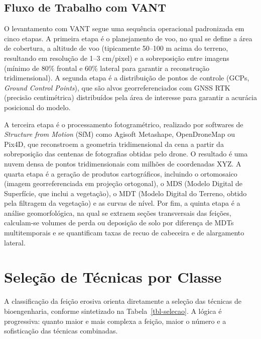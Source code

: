\documentclass[
  portuguese,
  11pt,
  a4paper,
  open=any]{scrbook}
\begin{document}
\subsection{Fluxo de Trabalho com
VANT}\label{fluxo-de-trabalho-com-vant}

O levantamento com VANT segue uma sequência operacional padronizada em
cinco etapas. A primeira etapa é o planejamento de voo, no qual se
define a área de cobertura, a altitude de voo (tipicamente 50--100 m
acima do terreno, resultando em resolução de 1--3 cm/pixel) e a
sobreposição entre imagens (mínimo de 80\% frontal e 60\% lateral para
garantir a reconstrução tridimensional). A segunda etapa é a
distribuição de pontos de controle (GCPs, \emph{Ground Control Points}),
que são alvos georreferenciados com GNSS RTK (precisão centimétrica)
distribuídos pela área de interesse para garantir a acurácia posicional
do modelo.

A terceira etapa é o processamento fotogramétrico, realizado por
softwares de \emph{Structure from Motion} (SfM) como Agisoft Metashape,
OpenDroneMap ou Pix4D, que reconstroem a geometria tridimensional da
cena a partir da sobreposição das centenas de fotografias obtidas pelo
drone. O resultado é uma nuvem densa de pontos tridimensionais com
milhões de coordenadas XYZ. A quarta etapa é a geração de produtos
cartográficos, incluindo o ortomosaico (imagem georreferenciada em
projeção ortogonal), o MDS (Modelo Digital de Superfície, que inclui a
vegetação), o MDT (Modelo Digital do Terreno, obtido pela filtragem da
vegetação) e as curvas de nível. Por fim, a quinta etapa é a análise
geomorfológica, na qual se extraem seções transversais das feições,
calculam-se volumes de perda ou deposição de solo por diferença de MDTs
multitemporais e se quantificam taxas de recuo de cabeceira e de
alargamento lateral.

\section{Seleção de Técnicas por
Classe}\label{seleuxe7uxe3o-de-tuxe9cnicas-por-classe}

A classificação da feição erosiva orienta diretamente a seleção das
técnicas de bioengenharia, conforme sintetizado na
Tabela~\ref{tbl-selecao}. A lógica é progressiva: quanto maior e mais
complexa a feição, maior o número e a sofisticação das técnicas
combinadas.
\end{document}
